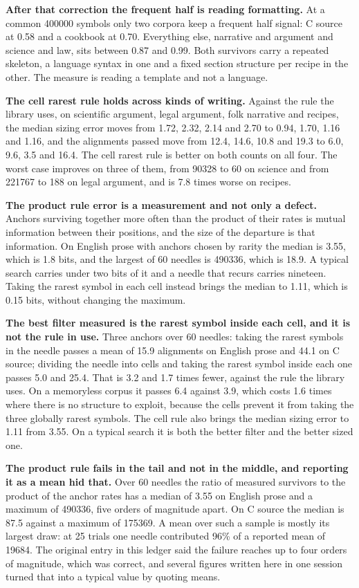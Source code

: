 \textbf{After that correction the frequent half is reading formatting.} At a common 400000 symbols only two corpora keep a frequent half signal: C source at 0.58 and a cookbook at 0.70. Everything else, narrative and argument and science and law, sits between 0.87 and 0.99. Both survivors carry a repeated skeleton, a language syntax in one and a fixed section structure per recipe in the other. The measure is reading a template and not a language.

\textbf{The cell rarest rule holds across kinds of writing.} Against the rule the library uses, on scientific argument, legal argument, folk narrative and recipes, the median sizing error moves from 1.72, 2.32, 2.14 and 2.70 to 0.94, 1.70, 1.16 and 1.16, and the alignments passed move from 12.4, 14.6, 10.8 and 19.3 to 6.0, 9.6, 3.5 and 16.4. The cell rarest rule is better on both counts on all four. The worst case improves on three of them, from 90328 to 60 on science and from 221767 to 188 on legal argument, and is 7.8 times worse on recipes.

\textbf{The product rule error is a measurement and not only a defect.} Anchors surviving together more often than the product of their rates is mutual information between their positions, and the size of the departure is that information. On English prose with anchors chosen by rarity the median is 3.55, which is 1.8 bits, and the largest of 60 needles is 490336, which is 18.9. A typical search carries under two bits of it and a needle that recurs carries nineteen. Taking the rarest symbol in each cell instead brings the median to 1.11, which is 0.15 bits, without changing the maximum.

\textbf{The best filter measured is the rarest symbol inside each cell, and it is not the rule in use.} Three anchors over 60 needles: taking the rarest symbols in the needle passes a mean of 15.9 alignments on English prose and 44.1 on C source; dividing the needle into cells and taking the rarest symbol inside each one passes 5.0 and 25.4. That is 3.2 and 1.7 times fewer, against the rule the library uses. On a memoryless corpus it passes 6.4 against 3.9, which costs 1.6 times where there is no structure to exploit, because the cells prevent it from taking the three globally rarest symbols. The cell rule also brings the median sizing error to 1.11 from 3.55. On a typical search it is both the better filter and the better sized one.

\textbf{The product rule fails in the tail and not in the middle, and reporting it as a mean hid that.} Over 60 needles the ratio of measured survivors to the product of the anchor rates has a median of 3.55 on English prose and a maximum of 490336, five orders of magnitude apart. On C source the median is 87.5 against a maximum of 175369. A mean over such a sample is mostly its largest draw: at 25 trials one needle contributed 96\% of a reported mean of 19684. The original entry in this ledger said the failure reaches up to four orders of magnitude, which was correct, and several figures written here in one session turned that into a typical value by quoting means.

